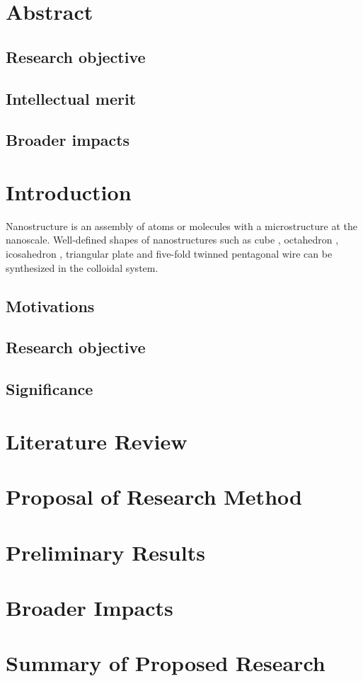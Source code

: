 \section{Abstract}

\subsection{Research objective}

\subsection{Intellectual merit}

\subsection{Broader impacts}

\section{Introduction}

Nanostructure is an assembly of atoms or molecules with a microstructure at the nanoscale. Well-defined shapes of nanostructures such as cube \cite{Im_2005}, octahedron \cite{Xia_2012}, icosahedron \cite{Xiong_2007}, triangular plate \cite{Lofton_2005} and five-fold twinned pentagonal wire \cite{Tsuji_2008} can be synthesized in the colloidal system.

\subsection{Motivations}

\subsection{Research objective}

\subsection{Significance}

\section{Literature Review}

\section{Proposal of Research Method}

\section{Preliminary Results}

\section{Broader Impacts}

\section{Summary of Proposed Research}